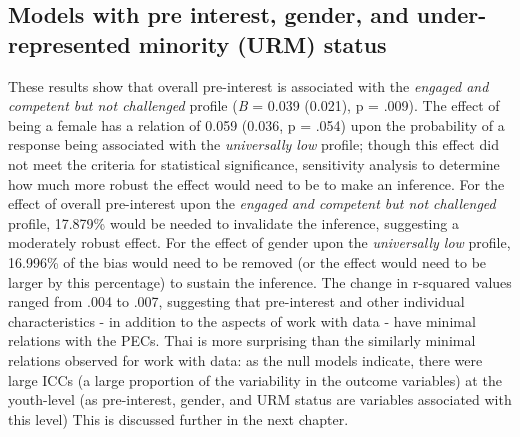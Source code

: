 \documentclass[]{msu-thesis}
\theoremstyle{definition}
\theoremstyle{definition}
\theoremstyle{definition}
\theoremstyle{remark}
\begin{document}
\subsection{Models with pre interest, gender, and under-represented
minority (URM)
status}\label{models-with-pre-interest-gender-and-under-represented-minority-urm-status}

These results show that overall pre-interest is associated with the
\emph{engaged and competent but not challenged} profile (\emph{B} =
0.039 (0.021), p = .009). The effect of being a female has a relation of
0.059 (0.036, p = .054) upon the probability of a response being
associated with the \emph{universally low} profile; though this effect
did not meet the criteria for statistical significance, sensitivity
analysis to determine how much more robust the effect would need to be
to make an inference. For the effect of overall pre-interest upon the
\emph{engaged and competent but not challenged} profile, 17.879\% would
be needed to invalidate the inference, suggesting a moderately robust
effect. For the effect of gender upon the \emph{universally low}
profile, 16.996\% of the bias would need to be removed (or the effect
would need to be larger by this percentage) to sustain the inference.
The change in r-squared values ranged from .004 to .007, suggesting that
pre-interest and other individual characteristics - in addition to the
aspects of work with data - have minimal relations with the PECs. Thai
is more surprising than the similarly minimal relations observed for
work with data: as the null models indicate, there were large ICCs (a
large proportion of the variability in the outcome variables) at the
youth-level (as pre-interest, gender, and URM status are variables
associated with this level) This is discussed further in the next
chapter.
\end{document}
